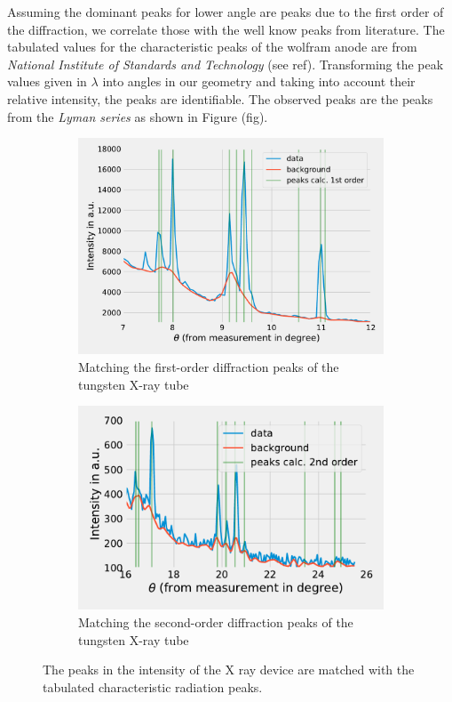 Assuming the dominant peaks for lower angle are peaks due to the first order of the diffraction, we correlate those with the well know peaks from literature. The tabulated values for the characteristic peaks of the wolfram anode are from \textit{National Institute of Standards and Technology} (see ref).
Transforming the peak values given in $\lambda$ into angles in our geometry and taking into account their relative intensity, the peaks are identifiable.
The observed peaks are the peaks from the \textit{Lyman series} as shown in Figure (fig).
\begin{figure}[h]
    \centering
    \begin{subfigure}[b]{0.6\textwidth}
        \includegraphics[width =\textwidth]{Programming/Absorption/MatchLine1.pdf}      
        \caption{Matching the first-order diffraction peaks of the tungsten X-ray tube}
      \label{fig:MatchLine1}
    \end{subfigure}
    \hspace{0.1\textwidth}
    \begin{subfigure}[b]{0.6\textwidth}
      \includegraphics[width = \textwidth]{Programming/Absorption/MatchLine2.pdf}      
      \caption{Matching the second-order diffraction peaks of the tungsten X-ray tube}
      \label{fig:MatchLine2}
    \end{subfigure}
    \caption{The peaks in the intensity of the X ray device are matched with the tabulated characteristic radiation peaks.}
    \label{fig:Peaks}
\end{figure}

